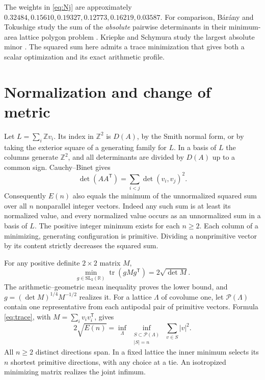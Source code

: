 \documentclass[11pt]{article}
\newcommand{\Z}{\mathbb Z}\newcommand{\R}{\mathbb R}\newcommand{\E}{\mathcal E}
\begin{document}
The weights in \eqref{eq:Nj} are approximately $0.32484,0.15610,0.19327,0.12773,0.16219,0.03587$.
For comparison, B\'ar\'any and Tokushige study the sum of the \emph{absolute} pairwise determinants in their minimum-area lattice polygon problem \cite{bt}. Kriepke and Schymura study the largest absolute minor \cite{ks}. The squared sum here admits a trace minimization that gives both a scalar optimization and its exact arithmetic profile.

\section{Normalization and change of metric}
Let $L=\sum_i\Z v_i$. Its index in $\Z^2$ is $D(A)$, by the Smith normal form, or by taking the exterior square of a generating family for $L$. In a basis of $L$ the columns generate $\Z^2$, and all determinants are divided by $D(A)$ up to a common sign. Cauchy--Binet gives
\[
 \det(AA^{\mathsf T})=\sum_{i<j}\det(v_i,v_j)^2.
\]
Consequently $E(n)$ also equals the minimum of the unnormalized squared sum over all $n$ nonparallel integer vectors. Indeed any such sum is at least its normalized value, and every normalized value occurs as an unnormalized sum in a basis of $L$. The positive integer minimum exists for each $n\ge2$. Each column of a minimizing, generating configuration is primitive. Dividing a nonprimitive vector by its content strictly decreases the squared sum.

For any positive definite $2\times2$ matrix $M$,
\begin{equation}
 \min_{g\in\mathrm{SL}_2(\R)}\operatorname{tr}(gMg^{\mathsf T})=2\sqrt{\det M}.
 \label{eq:trace}
\end{equation}
The arithmetic--geometric mean inequality proves the lower bound, and $g=(\det M)^{1/4}M^{-1/2}$ realizes it. For a lattice $\Lambda$ of covolume one, let $\mathcal P(\Lambda)$ contain one representative from each antipodal pair of primitive vectors. Formula \eqref{eq:trace}, with $M=\sum_i v_iv_i^{\mathsf T}$, gives
\begin{equation}
 2\sqrt{E(n)}=\inf_{\Lambda}\ \inf_{\substack{S\subset\mathcal P(\Lambda)\\ |S|=n}}
            \ \sum_{v\in S}|v|^2.\label{eq:min}
\end{equation}
All $n\ge2$ distinct directions span. In a fixed lattice the inner minimum selects its $n$ shortest primitive directions, with any choice at a tie. An isotropized minimizing matrix realizes the joint infimum.
\end{document}
